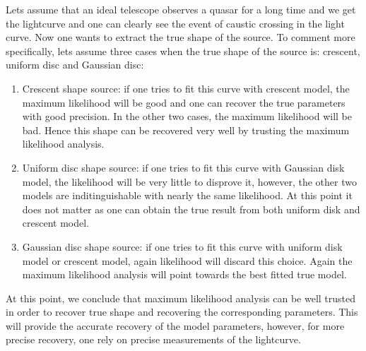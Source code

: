 Lets assume that an ideal telescope observes a quasar for a long time and we get the lightcurve  and one can clearly see the event of caustic crossing in the light curve. Now one wants to extract the true shape of the source. To comment more specifically, lets assume three cases when the true shape of the source is: crescent, uniform disc and Gaussian disc:

\begin{enumerate}

\item Crescent shape source: if one tries to fit this curve with crescent model, the maximum likelihood will be good and one can recover the true parameters with good precision. In the other two cases, the maximum likelihood will be bad. Hence this shape can be recovered very well by trusting the maximum likelihood analysis.
\item Uniform disc shape source: if one tries to fit this curve with Gaussian disk model, the likelihood will be very little to disprove it, however, the other two models are inditinguishable with nearly the same likelihood. At this point it does not matter as one can obtain the true result from both uniform disk and crescent model.
\item Gaussian disc shape source: if one tries to fit this curve with uniform disk model or crescent model, again likelihood will discard this choice. Again the maximum likelihood analysis will point towards the best fitted true model.
\end{enumerate}

At this point, we conclude that maximum likelihood analysis can be well trusted in order to recover true shape and recovering the corresponding parameters. This will provide the accurate recovery of the model parameters, however, for more precise recovery, one rely on precise measurements of the lightcurve.

 
